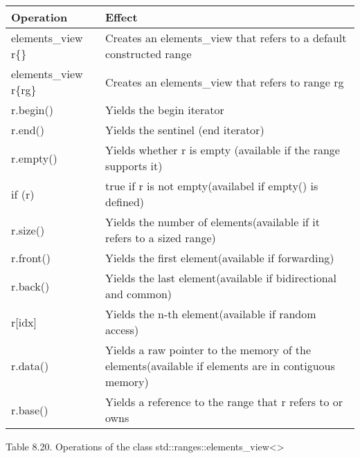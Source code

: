 \begin{longtable}[c]{|l|l|}
\hline
\textbf{Operation}     & \textbf{Effect}                                                \\ \hline
\endfirsthead
%
\endhead
%
elements\_view r\{\} & Creates an elements\_view that refers to a default constructed range                               \\ \hline
elements\_view r\{rg\} & Creates an elements\_view that refers to range rg              \\ \hline
r.begin()              & Yields the begin iterator                                      \\ \hline
r.end()                & Yields the sentinel (end iterator)                             \\ \hline
r.empty()              & Yields whether r is empty (available if the range supports it) \\ \hline
if (r)                 & true if r is not empty(availabel if empty() is defined)        \\ \hline
r.size()             & Yields the number of elements(available if it refers to a sized range)                             \\ \hline
r.front()              & Yields the first element(available if forwarding)              \\ \hline
r.back()               & Yields the last element(available if bidirectional and common) \\ \hline
r{[}idx{]}             & Yields the n-th element(available if random access)            \\ \hline
r.data()             & Yields a raw pointer to the memory of the elements(available if elements are in contiguous memory) \\ \hline
r.base()               & Yields a reference to the range that r refers to or owns       \\ \hline
\end{longtable}

\begin{center}
Table 8.20. Operations of the class std::ranges::elements\_view<>
\end{center}

	

